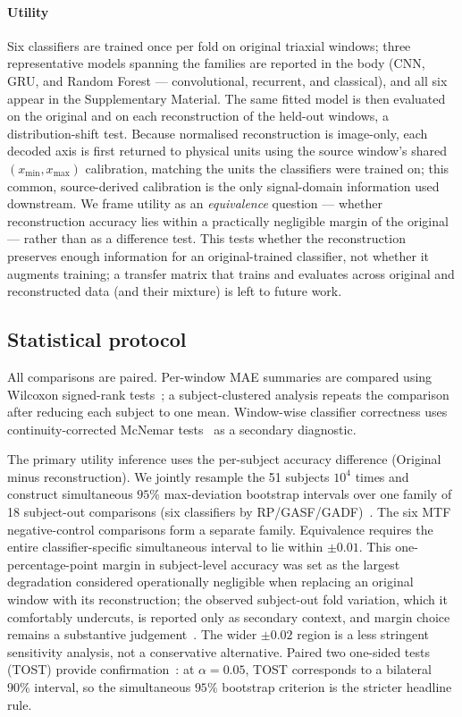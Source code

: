\documentclass[5p]{elsarticle}
\begin{document}
\paragraph{Utility}
Six classifiers are trained once per fold on original triaxial windows; three representative models spanning the families are reported in the body (CNN, GRU, and Random Forest --- convolutional, recurrent, and classical), and all six appear in the Supplementary Material. The same fitted model is then evaluated on the original and on each reconstruction of the held-out windows, a distribution-shift test. Because normalised reconstruction is image-only, each decoded axis is first returned to physical units using the source window's shared \((x_{\min},x_{\max})\) calibration, matching the units the classifiers were trained on; this common, source-derived calibration is the only signal-domain information used downstream. We frame utility as an \emph{equivalence} question --- whether reconstruction accuracy lies within a practically negligible margin of the original --- rather than as a difference test. This tests whether the reconstruction preserves enough information for an original-trained classifier, not whether it augments training; a transfer matrix that trains and evaluates across original and reconstructed data (and their mixture) is left to future work.

\subsection{Statistical protocol}\label{sec:statistical_protocol}

All comparisons are paired. Per-window MAE summaries are compared using Wilcoxon signed-rank tests~\cite{Wilcoxon1945}; a subject-clustered analysis repeats the comparison after reducing each subject to one mean. Window-wise classifier correctness uses continuity-corrected McNemar tests~\cite{McNemar1947} as a secondary diagnostic.

The primary utility inference uses the per-subject accuracy difference (Original minus reconstruction). We jointly resample the 51 subjects \(10^4\) times and construct simultaneous \(95\%\) max-deviation bootstrap intervals over one family of 18 subject-out comparisons (six classifiers by RP/GASF/GADF)~\cite{DavisonHinkley1997,Hall1987}. The six MTF negative-control comparisons form a separate family. Equivalence requires the entire classifier-specific simultaneous interval to lie within \(\pm0.01\). This one-percentage-point margin in subject-level accuracy was set as the largest degradation considered operationally negligible when replacing an original window with its reconstruction; the observed subject-out fold variation, which it comfortably undercuts, is reported only as secondary context, and margin choice remains a substantive judgement~\cite{Lakens2017}. The wider \(\pm0.02\) region is a less stringent sensitivity analysis, not a conservative alternative. Paired two one-sided tests (TOST) provide confirmation~\cite{Schuirmann1987}: at \(\alpha=0.05\), TOST corresponds to a bilateral \(90\%\) interval, so the simultaneous \(95\%\) bootstrap criterion is the stricter headline rule.
\end{document}
